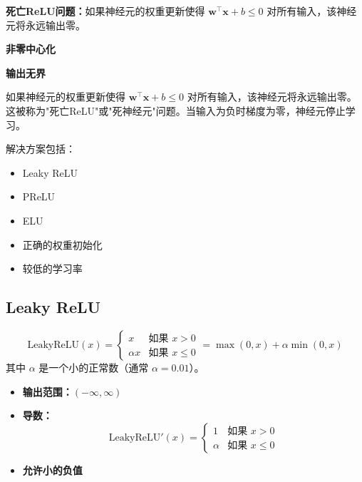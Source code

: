 \begin{disadvantages}
    \item \textbf{死亡ReLU问题：}如果神经元的权重更新使得 $\mathbf{w}^\top \mathbf{x} + b \leq 0$ 对所有输入，该神经元将永远输出零。
    \item \textbf{非零中心化}
    \item \textbf{输出无界}
\end{disadvantages}

\begin{note}[死亡ReLU问题]
如果神经元的权重更新使得 $\mathbf{w}^\top \mathbf{x} + b \leq 0$ 对所有输入，该神经元将永远输出零。这被称为"死亡ReLU"或"死神经元"问题。当输入为负时梯度为零，神经元停止学习。

解决方案包括：
\begin{itemize}
    \item Leaky ReLU
    \item PReLU
    \item ELU
    \item 正确的权重初始化
    \item 较低的学习率
\end{itemize}
\end{note}

\subsection{Leaky ReLU}

\begin{equation}
\text{LeakyReLU}(x) = 
\begin{cases}
x & \text{如果 } x > 0 \\
\alpha x & \text{如果 } x \leq 0
\end{cases}
= \max(0, x) + \alpha \min(0, x)
\end{equation}
其中 $\alpha$ 是一个小的正常数（通常 $\alpha = 0.01$）。

\begin{properties}
\begin{itemize}
    \item \textbf{输出范围：}$(-\infty, \infty)$
    \item \textbf{导数：} 
    \begin{equation}
    \text{LeakyReLU}'(x) = 
    \begin{cases}
    1 & \text{如果 } x > 0 \\
    \alpha & \text{如果 } x \leq 0
    \end{cases}
    \end{equation}
    \item \textbf{允许小的负值}
\end{itemize}
\end{properties}

